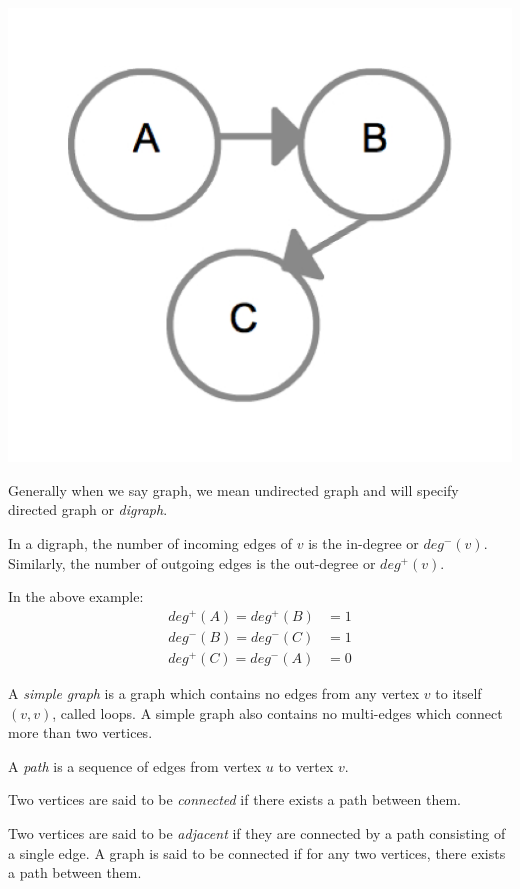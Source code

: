 {
  \includegraphics[scale=0.2]{DiGraph}
  \label{fig:DiGraph}
}

Generally when we say graph, we mean undirected graph and will specify
directed graph or \emph{digraph}.

In a digraph, the number of incoming edges of $v$ is the in-degree or
$deg^-(v)$.  Similarly, the number of outgoing edges is the
out-degree or $deg^+(v)$.

In the above example:
%
\begin{align*}
deg^+(A) = deg^+(B) &= 1 \\
deg^-(B) = deg^-(C) &= 1 \\
deg^+(C) = deg^-(A) &= 0
\end{align*}

A \emph{simple graph} is a graph which contains no edges from any
vertex $v$ to itself $ (v,v) $, called loops.  A simple graph also
contains no multi-edges which connect more than two vertices.

A \emph{path} is a sequence of edges from vertex $u$ to vertex $v$.

Two vertices are said to be \emph{connected} if there exists a path
between them.  

Two vertices are said to be \emph{adjacent} if they are connected by a
path consisting of a single edge.  A graph is said to be connected if
for any two vertices, there exists a path between them.

